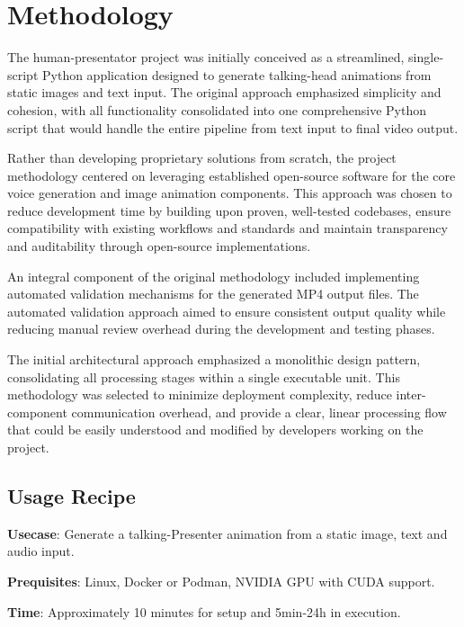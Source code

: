 
\section{Methodology}

The human-presentator project was initially conceived as a streamlined, single-script Python
application designed to generate talking-head animations from static images and text input. The
original approach emphasized simplicity and cohesion, with all functionality consolidated into one
comprehensive Python script that would handle the entire pipeline from text input to final video
output.

Rather than developing proprietary solutions from scratch, the project methodology centered on
leveraging established open-source software for the core voice generation and image animation
components. This approach was chosen to reduce development time by building upon proven, well-tested
codebases, ensure compatibility with existing workflows and standards and maintain transparency and
auditability through open-source implementations.

An integral component of the original methodology included implementing automated validation
mechanisms for the generated MP4 output files. The automated validation approach aimed to ensure
consistent output quality while reducing manual review overhead during the development and testing
phases.

The initial architectural approach emphasized a monolithic design pattern, consolidating all
processing stages within a single executable unit. This methodology was selected to minimize
deployment complexity, reduce inter-component communication overhead, and provide a clear, linear
processing flow that could be easily understood and modified by developers working on the project.

\subsection{Usage Recipe}


\textbf{Usecase}: Generate a talking-Presenter animation from a static image, text and audio input.

\textbf{Prequisites}: Linux, Docker or Podman, NVIDIA GPU with CUDA support.

\textbf{Time}: Approximately 10 minutes for setup and 5min-24h in execution.


